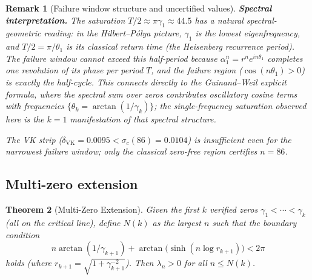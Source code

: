 \documentclass[11pt]{article}
\newtheorem{theorem}{Theorem}
\newtheorem{remark}[theorem]{Remark}
\begin{document}
\begin{remark}[Failure window structure and uncertified values]
\textbf{Spectral interpretation.}
The saturation $T/2 \approx \pi\gamma_1 \approx 44.5$ has a natural spectral-geometric reading:
in the Hilbert--P\'olya picture, $\gamma_1$ is the lowest eigenfrequency, and $T/2 = \pi/\theta_1$
is its \emph{classical return time} (the Heisenberg recurrence period).
The failure window cannot exceed this half-period because $\alpha_1^n = r^n e^{in\theta_1}$
completes one revolution of its phase per period $T$, and the failure region ($\cos(n\theta_1) > 0$)
is exactly the half-cycle.  This connects directly to the Guinand--Weil explicit formula,
where the spectral sum over zeros contributes oscillatory cosine terms with frequencies
$\{\theta_k = \arctan(1/\gamma_k)\}$; the single-frequency saturation observed here
is the $k=1$ manifestation of that spectral structure.

The VK strip ($\delta_{\mathrm{VK}} = 0.0095 < \sigma_c(86) = 0.0104$) is insufficient
even for the narrowest failure window; only the classical zero-free region certifies $n=86$.
\end{remark}

\subsection{Multi-zero extension}
\label{sec:thm4}

\begin{theorem}[Multi-Zero Extension]
\label{thm:multi_zero}
Given the first $k$ verified zeros $\gamma_1 < \cdots < \gamma_k$ (all on the critical line),
define $N(k)$ as the largest $n$ such that the boundary condition
\[
  n\arctan(1/\gamma_{k+1}) + \arctan\!\bigl(\sinh(n\log r_{k+1})\bigr) < 2\pi
\]
holds (where $r_{k+1} = \sqrt{1+\gamma_{k+1}^{-2}}$).
Then $\lambda_n > 0$ for all $n \le N(k)$.
\end{theorem}
\end{document}
